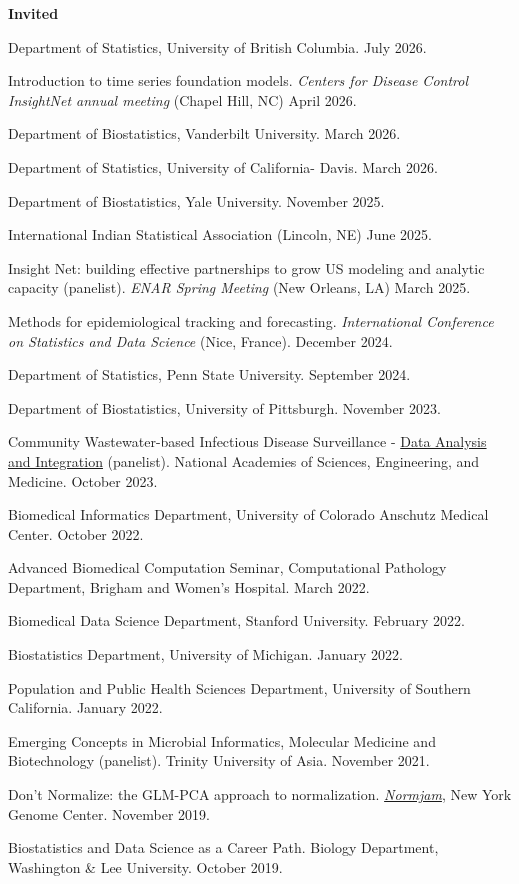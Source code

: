 \documentclass[10pt]{article}
\renewcommand{\section}[2]%
        {\pagebreak[2]\vspace{1.3\baselineskip}%
         \phantomsection\addcontentsline{toc}{section}{#1}%
         \hspace{0in}%
         \marginpar{
         \raggedright \scshape #1}#2}
\begin{document}
\section{Talks}
\textbf{Invited}
\begin{enumerate}[label= {[\arabic*]}]
\item Department of Statistics, University of British Columbia. July 2026.
\item Introduction to time series foundation models. {\it Centers for Disease Control InsightNet annual meeting} (Chapel Hill, NC) April 2026.
\item Department of Biostatistics, Vanderbilt University. March 2026.
\item Department of Statistics, University of California- Davis. March 2026.
\item Department of Biostatistics, Yale University. November 2025.
\item International Indian Statistical Association (Lincoln, NE) June 2025.
\item Insight Net: building effective partnerships to grow US modeling and analytic capacity (panelist). {\it ENAR Spring Meeting} (New Orleans, LA) March 2025.
\item Methods for epidemiological tracking and forecasting. {\it International Conference on Statistics and Data Science} (Nice, France). December 2024. 
\item Department of Statistics, Penn State University. September 2024.
\item Department of Biostatistics, University of Pittsburgh. November 2023.
\item Community Wastewater-based Infectious Disease Surveillance - \href{https://www.nationalacademies.org/event/40901_10-2023_community-wastewater-based-infectious-disease-surveillance-data-analysis-and-integration-open-subgroup-meeting-1}{Data Analysis and Integration} (panelist). National Academies of Sciences, Engineering, and Medicine. October 2023.
\item Biomedical Informatics Department, University of Colorado Anschutz Medical Center. October 2022.
\item Advanced Biomedical Computation Seminar, Computational Pathology Department, Brigham and Women's Hospital. March 2022.
\item Biomedical Data Science Department, Stanford University. February 2022.
\item Biostatistics Department, University of Michigan. January 2022.
\item Population and Public Health Sciences Department, University of Southern California. January 2022.
\item Emerging Concepts in Microbial Informatics, Molecular Medicine and Biotechnology (panelist). Trinity University of Asia. November 2021.
\item Don't Normalize: the GLM-PCA approach to normalization. \href{https://normjam.github.io/}{{\it Normjam}}, New York Genome Center. November 2019.
\item Biostatistics and Data Science as a Career Path. Biology Department, Washington \& Lee University. October 2019.
\end{enumerate}
\end{document}
